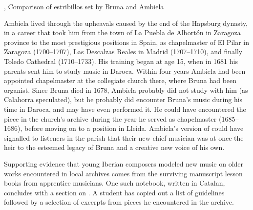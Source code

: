 {, Comparison of estribillos set by Bruna and Ambiela}

Ambiela lived through the upheavals caused by the end of the Hapsburg dynasty,
in a career that took him from the town of La Puebla de Albortón in Zaragoza
province to the most prestigious positions in Spain, as chapelmaster of El
Pilar in Zaragoza (1700--1707), Las Descalzas Reales in Madrid (1707--1710),
and finally Toledo Cathedral (1710--1733).%
    \Autocites
    [1]{Calahorra:Suban}
    []{Grove}
    {Alvarez:Ambiela}
His training began at age 15, when in 1681 his parents sent him to study music
in Daroca.
Within four years Ambiela had been appointed chapelmaster at the collegiate
church there, where Bruna had been organist.
Since Bruna died in 1678, Ambiela probably did not study with him (as Calahorra
speculated), but he probably did encounter Bruna's music during his time in
Daroca, and may have even performed it.%
    \Autocite{Calahorra:Suban}
He could have encountered the piece in the church's archive during the year he
served as chapelmaster (1685--1686), before moving on to a position in Lleida.
Ambiela's version of  could have signalled to listeners
in the parish that their new chief musician was at once the heir to the
esteemed legacy of Bruna and a creative new voice of his own.

Supporting evidence that young Iberian composers modeled new music on older
works encountered in local archives comes from the surviving manuscript lesson
books from apprentice musicians.
One such notebook, written in Catalan, concludes with a section on .%
    \Autocite{Cpt-Notes-Girona}
A student has copied out a list of guidelines followed by a selection of
excerpts from pieces he encountered in the archive.

